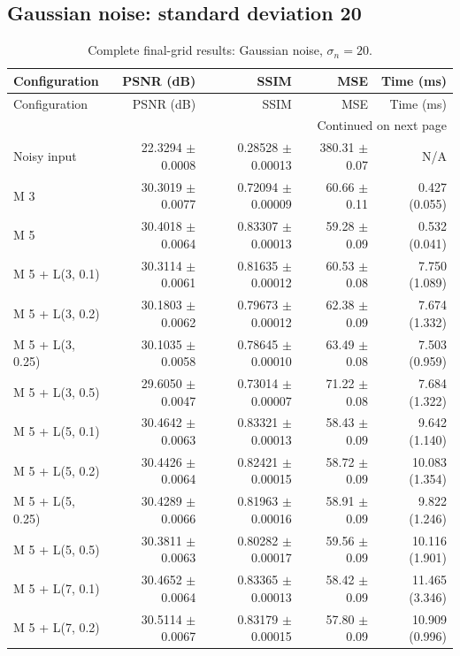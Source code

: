 \subsection{Gaussian noise: standard deviation 20}
\begingroup
\footnotesize
\setlength{\tabcolsep}{4pt}
\begin{longtable}{lrrrr}
\caption{Complete final-grid results: Gaussian noise, $\sigma_n=20$.}\\
\toprule Configuration & PSNR (dB) & SSIM & MSE & Time (ms) \\ \midrule
\endfirsthead
\toprule Configuration & PSNR (dB) & SSIM & MSE & Time (ms) \\ \midrule
\endhead
\midrule \multicolumn{5}{r}{Continued on next page}\\
\endfoot
\bottomrule
\endlastfoot
Noisy input & 22.3294 $\pm$ 0.0008 & 0.28528 $\pm$ 0.00013 & 380.31 $\pm$ 0.07 & N/A \\
M 3 & 30.3019 $\pm$ 0.0077 & 0.72094 $\pm$ 0.00009 & 60.66 $\pm$ 0.11 & 0.427 (0.055) \\
M 5 & 30.4018 $\pm$ 0.0064 & 0.83307 $\pm$ 0.00013 & 59.28 $\pm$ 0.09 & 0.532 (0.041) \\
M 5 + L(3, 0.1) & 30.3114 $\pm$ 0.0061 & 0.81635 $\pm$ 0.00012 & 60.53 $\pm$ 0.08 & 7.750 (1.089) \\
M 5 + L(3, 0.2) & 30.1803 $\pm$ 0.0062 & 0.79673 $\pm$ 0.00012 & 62.38 $\pm$ 0.09 & 7.674 (1.332) \\
M 5 + L(3, 0.25) & 30.1035 $\pm$ 0.0058 & 0.78645 $\pm$ 0.00010 & 63.49 $\pm$ 0.08 & 7.503 (0.959) \\
M 5 + L(3, 0.5) & 29.6050 $\pm$ 0.0047 & 0.73014 $\pm$ 0.00007 & 71.22 $\pm$ 0.08 & 7.684 (1.322) \\
M 5 + L(5, 0.1) & 30.4642 $\pm$ 0.0063 & 0.83321 $\pm$ 0.00013 & 58.43 $\pm$ 0.09 & 9.642 (1.140) \\
M 5 + L(5, 0.2) & 30.4426 $\pm$ 0.0064 & 0.82421 $\pm$ 0.00015 & 58.72 $\pm$ 0.09 & 10.083 (1.354) \\
M 5 + L(5, 0.25) & 30.4289 $\pm$ 0.0066 & 0.81963 $\pm$ 0.00016 & 58.91 $\pm$ 0.09 & 9.822 (1.246) \\
M 5 + L(5, 0.5) & 30.3811 $\pm$ 0.0063 & 0.80282 $\pm$ 0.00017 & 59.56 $\pm$ 0.09 & 10.116 (1.901) \\
M 5 + L(7, 0.1) & 30.4652 $\pm$ 0.0064 & 0.83365 $\pm$ 0.00013 & 58.42 $\pm$ 0.09 & 11.465 (3.346) \\
M 5 + L(7, 0.2) & 30.5114 $\pm$ 0.0067 & 0.83179 $\pm$ 0.00015 & 57.80 $\pm$ 0.09 & 10.909 (0.996) \\

\end{longtable}
